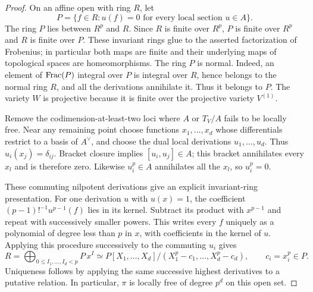 \begin{proof}
On an affine open with ring $R$, let
\[
  P=\{f\in R: u(f)=0\text{ for every local section }u\in A\}.
\]
The ring $P$ lies between $R^p$ and $R$.  Since $R$ is finite over $R^p$,
$P$ is finite over $R^p$ and $R$ is finite over $P$.  These invariant
rings glue to the asserted factorization of Frobenius; in particular both
maps are finite and their underlying maps of topological spaces are
homeomorphisms.  The ring $P$ is normal.  Indeed, an element of
$\operatorname{Frac}(P)$ integral over $P$ is integral over $R$, hence belongs to the
normal ring $R$, and all the derivations annihilate it.  Thus it belongs
to $P$.  The variety $W$ is projective because it is finite over the
projective variety $V^{(1)}$.

Remove the codimension-at-least-two loci where $A$ or $T_V/A$ fails to be
locally free.  Near any remaining point choose functions
$x_1,\ldots,x_d$ whose differentials restrict to a basis of $A^\vee$,
and choose the dual local derivations $u_1,\ldots,u_d$.  Thus
$u_i(x_j)=\delta_{ij}$.  Bracket closure implies $[u_i,u_j]\in A$; this
bracket annihilates every $x_l$ and is therefore zero.  Likewise
$u_i^p\in A$ annihilates all the $x_l$, so $u_i^p=0$.

These commuting nilpotent derivations give an explicit invariant-ring
presentation.  For one derivation $u$ with $u(x)=1$, the coefficient
$(p-1)!^{-1}u^{p-1}(f)$ lies in its kernel.  Subtract its product with
$x^{p-1}$ and repeat with successively smaller powers.  This writes every
$f$ uniquely as a polynomial of degree less than $p$ in $x$, with
coefficients in the kernel of $u$.  Applying this procedure successively
to the commuting $u_i$ gives
\begin{equation}
  R=\bigoplus_{0\le I_1,\ldots,I_d<p}P\,x^I
  \simeq
  P[X_1,\ldots,X_d]/(X_1^p-c_1,\ldots,X_d^p-c_d),
  \qquad c_i=x_i^p\in P.
  \label{eq:foliation-local-presentation}
\end{equation}
Uniqueness follows by applying the same successive highest derivatives
to a putative relation.  In particular, $\pi$ is locally free of degree
$p^d$ on this open set.


\end{proof}
